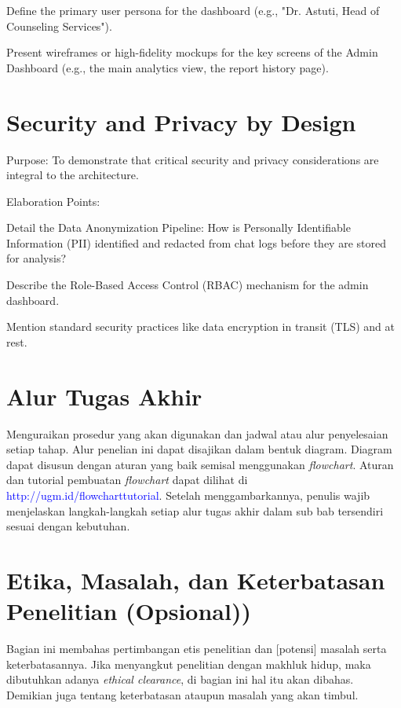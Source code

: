 Define the primary user persona for the dashboard (e.g., "Dr. Astuti, Head of Counseling Services").

Present wireframes or high-fidelity mockups for the key screens of the Admin Dashboard (e.g., the main analytics view, the report history page).

\section{Security and Privacy by Design}
Purpose: To demonstrate that critical security and privacy considerations are integral to the architecture.

Elaboration Points:

Detail the Data Anonymization Pipeline: How is Personally Identifiable Information (PII) identified and redacted from chat logs before they are stored for analysis?

Describe the Role-Based Access Control (RBAC) mechanism for the admin dashboard.

Mention standard security practices like data encryption in transit (TLS) and at rest.

\section{Alur Tugas Akhir}

Menguraikan prosedur yang akan digunakan dan jadwal atau alur penyelesaian setiap 
tahap. Alur penelian ini dapat disajikan dalam bentuk diagram. Diagram dapat disusun dengan aturan yang baik semisal menggunakan \textit{flowchart}. Aturan dan tutorial pembuatan \textit{flowchart} dapat dilihat di \textcolor{blue}{http://ugm.id/flowcharttutorial}. Setelah menggambarkannya, penulis wajib menjelaskan langkah-langkah setiap alur tugas akhir dalam sub bab tersendiri sesuai dengan kebutuhan.

\section{Etika, Masalah, dan Keterbatasan Penelitian (Opsional))}

Bagian ini membahas pertimbangan etis penelitian dan [potensi] masalah serta
keterbatasannya. Jika menyangkut penelitian dengan makhluk hidup, maka dibutuhkan adanya \textit{ethical clearance}, di bagian ini hal itu akan dibahas. Demikian juga tentang keterbatasan ataupun masalah yang akan timbul.
